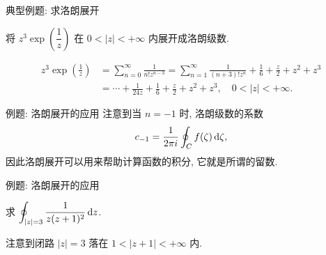 \begin{frame}{典型例题: 求洛朗展开}
\onslide<+->
\begin{exercise}
将 $z^3\exp\left(\dfrac1z\right)$ 在 $0<|z|<+\infty$ 内展开成洛朗级数.
\end{exercise}
\onslide<+->
\begin{answer}
\vspace{-\baselineskip}
\begin{align*}
z^3\exp\left(\frac1z\right)&=\sum_{n=0}^\infty\frac{1}{n!z^{n-3}}
=\sum_{n=1}^\infty\frac1{(n+3)! z^n}+\frac16+\frac z2+z^2+z^3\\
&=\cdots+\frac1{24z}+\frac16+\frac z2+z^2+z^3,\quad 0<|z|<+\infty.
\end{align*}
\end{answer}
\end{frame}


\begin{frame}{例题: 洛朗展开的应用}
\onslide<+->
注意到当 $n=-1$ 时, 洛朗级数的系数
\[c_{-1}=\frac1{2\pi i}\oint_C f(\zeta)\,\mathrm{d}\zeta,\]
\onslide<+->
因此洛朗展开可以用来帮助计算函数的积分,
\onslide<+->
它就是所谓的\alert{留数}.
\end{frame}


\begin{frame}{例题: 洛朗展开的应用}
\onslide<+->
\begin{example}
求 $\displaystyle\oint_{|z|=3}\frac1{z(z+1)^2}\,\mathrm{d} z$.
\end{example}
\onslide<+->
\begin{solution}
注意到闭路 $|z|=3$ 落在 $1<|z+1|<+\infty$ 内.
\vspace{-0.8\baselineskip}
\vspace{-0.3\baselineskip}
\end{solution}
\end{frame}


